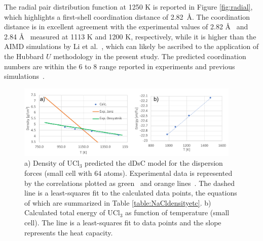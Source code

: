 \documentclass[preprint,3p,10pt,onecolumn,number,sort&compress]{elsarticle}
\begin{document}
The radial pair distribution function at 1250 K is reported in Figure \ref{fig:radial}, which highlights a first-shell coordination distance of 2.82~\AA. The coordination distance is in excellent agreement with the experimental values of 2.82 \AA~\cite{Neilson} and 2.84 \AA~\cite{Okamoto} measured at 1113 K and 1200 K, respectively, while it is higher than the AIMD simulations by Li et al.~\cite{Li}, which can likely be ascribed to the application of the Hubbard $U$ methodology in the present study. The predicted coordination numbers are within the 6 to 8 range reported in experiments and previous simulations~\cite{Li,Neilson,Okamoto}. %
 

\begin{figure}[htb]
\centering
\includegraphics[width=0.95\textwidth]{FIG4.pdf}
\caption{a) Density of UCl$_3$ predicted the dDsC model for the dispersion forces (small cell with 64 atoms). Experimental data is represented by the correlations plotted as green~\cite{Desyatnik} and orange lines~\cite{Janz1988}. The dashed line is a least-squares fit to the calculated data points, the equations of which are summarized in Table \ref{table:NaCldensityetc}. b) Calculated total energy of UCl$_3$ as function of temperature (small cell). The line is a least-squares fit to data points and the slope represents the heat capacity.} 
\label{fig:UCl3density}
\end{figure}
\end{document}
